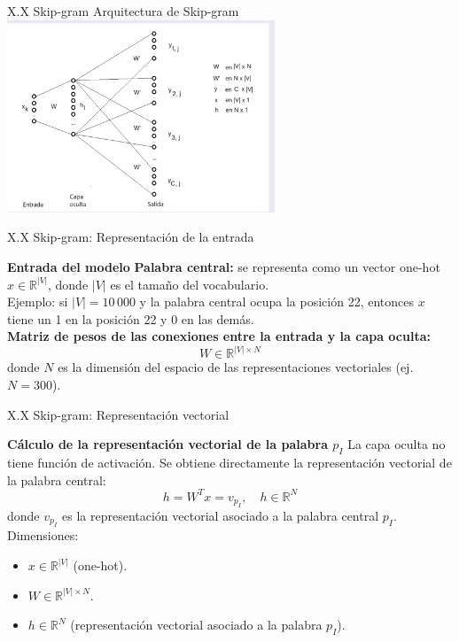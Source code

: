\documentclass{beamer}
\begin{document}
\begin{frame}[fragile]{X.X Skip-gram}
	\centering
	\Large Arquitectura de Skip-gram
	\vspace{0.5cm} 
	\vfill
	\includegraphics[width=0.6\textwidth]{Skip_arq.png}
	\vfill
\end{frame}

\begin{frame}[fragile]{X.X Skip-gram: Representación de la entrada}
	\begin{block}{\textbf{Entrada del modelo}}
		\justifying
		\textbf{Palabra central:} se representa como un vector one-hot $x \in \mathbb{R}^{|V|}$, 
		donde $|V|$ es el tamaño del vocabulario.\\
		\vspace{0.2cm}
		Ejemplo: si $|V|=10\,000$ y la palabra central ocupa la posición 22, 
		entonces $x$ tiene un 1 en la posición 22 y 0 en las demás.\\
		\vspace{0.2cm}
		\textbf{Matriz de pesos de las conexiones entre la entrada y la capa oculta:} 
		\[
		W \in \mathbb{R}^{|V| \times N}
		\]
		donde $N$ es la dimensión del espacio de las representaciones vectoriales (ej. $N=300$).
	\end{block}
\end{frame}

\begin{frame}[fragile]{X.X Skip-gram: Representación vectorial}
	\begin{block}{\textbf{Cálculo de la representación vectorial de la palabra $p_I$}}
		\justifying
		La capa oculta no tiene función de activación. 
		Se obtiene directamente la representación vectorial de la palabra central:
		\[
		h = W^T x = v_{p_I}, \quad h \in \mathbb{R}^N
		\]
		donde $v_{p_I}$ es la representación vectorial asociado a la palabra central $p_I$.\\
		\vspace{0.2cm}
		Dimensiones:
		\begin{itemize}
			\item $x \in \mathbb{R}^{|V|}$ (one-hot).
			\item $W \in \mathbb{R}^{|V| \times N}$.
			\item $h \in \mathbb{R}^N$ (representación vectorial asociado a la palabra $p_I$).
		\end{itemize}
	\end{block}
\end{frame}
\end{document}
